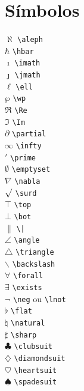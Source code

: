 \documentclass[xindy,draft]{fei}
\begin{document}
\section{Símbolos}
\begin{multicols}{3}
\noindent
\(\aleph\) \verb+\aleph+\\
\(\hbar\) \verb+\hbar+\\
\(\imath\) \verb+\imath+\\
\(\jmath\) \verb+\jmath+\\
\(\ell\) \verb+\ell+\\
\(\wp\) \verb+\wp+\\
\(\Re\) \verb+\Re+\\
\(\Im\) \verb+\Im+\\
\(\partial\) \verb+\partial+\\
\(\infty\) \verb+\infty+\\
\(\prime\) \verb+\prime+\\
\(\emptyset\) \verb+\emptyset+\\
\(\nabla\) \verb+\nabla+\\
\(\surd\) \verb+\surd+\\
\(\top\) \verb+\top+\\
\(\bot\) \verb+\bot+\\
\(\|\) \verb+\|+\\
\(\angle\) \verb+\angle+\\
\(\triangle\) \verb+\triangle+\\
\(\backslash\) \verb+\backslash+\\
\(\forall\) \verb+\forall+\\
\(\exists\) \verb+\exists+\\
\(\lnot\) \verb+\neg+ ou \verb+\lnot+\\
\(\flat\) \verb+\flat+\\
\(\natural\) \verb+\natural+\\
\(\sharp\) \verb+\sharp+\\
\(\clubsuit\) \verb+\clubsuit+\\
\(\diamondsuit\) \verb+\diamondsuit+\\
\(\heartsuit\) \verb+\heartsuit+\\
\(\spadesuit\) \verb+\spadesuit+\\
\end{multicols}
\end{document}
